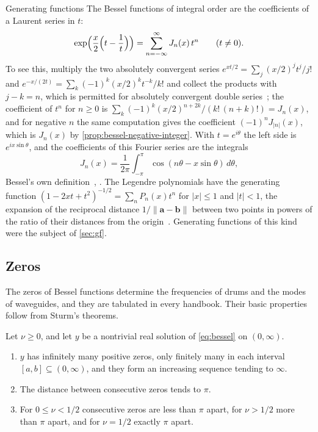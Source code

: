 \begin{note}{Generating functions}
The Bessel functions of integral order are the coefficients of a Laurent series in $t$:
\[
\exp\Bigl(\frac x2\Bigl(t-\frac1t\Bigr)\Bigr)=\sum_{n=-\infty}^\infty J_n(x)\,t^n\qquad(t\ne0).
\]
To see this, multiply the two absolutely convergent series $e^{xt/2}=\sum_j(x/2)^jt^j/j!$ and $e^{-x/(2t)}=\sum_k(-1)^k(x/2)^kt^{-k}/k!$ and collect the products with $j-k=n$, which is permitted for absolutely convergent double series~\cite[Chap.~II]{knopp1990}; the coefficient of $t^n$ for $n\ge0$ is $\sum_k(-1)^k(x/2)^{n+2k}/(k!\,(n+k)!)=J_n(x)$, and for negative $n$ the same computation gives the coefficient $(-1)^nJ_{|n|}(x)$, which is $J_n(x)$ by \cref{prop:bessel-negative-integer}. With $t=e^{i\theta}$ the left side is $e^{ix\sin\theta}$, and the coefficients of this Fourier series are the integrals
\[
J_n(x)=\frac1{2\pi}\int_{-\pi}^\pi\cos(n\theta-x\sin\theta)\,d\theta ,
\]
Bessel's own definition~\cite{bessel1824}, \cite[Chap.~II]{watson1944}. The Legendre polynomials have the generating function $(1-2xt+t^2)^{-1/2}=\sum_nP_n(x)t^n$ for $|x|\le1$ and $|t|<1$, the expansion of the reciprocal distance $1/\|\mathbf a-\mathbf b\|$ between two points in powers of the ratio of their distances from the origin~\cite[Chap.~XV]{whittaker1927}. Generating functions of this kind were the subject of \cref{sec:gf}.
\end{note}

\subsection{Zeros}

The zeros of Bessel functions determine the frequencies of drums and the modes of waveguides, and they are tabulated in every handbook. Their basic properties follow from Sturm's theorems.

\begin{theorem}
\label{thm:bessel-zeros}
Let $\nu\ge0$, and let $y$ be a nontrivial real solution of \eqref{eq:bessel} on $(0,\infty)$.
\begin{enumerate}
\item $y$ has infinitely many positive zeros, only finitely many in each interval $[a,b]\subseteq(0,\infty)$, and they form an increasing sequence tending to $\infty$.
\item The distance between consecutive zeros tends to $\pi$.
\item For $0\le\nu<1/2$ consecutive zeros are less than $\pi$ apart, for $\nu>1/2$ more than $\pi$ apart, and for $\nu=1/2$ exactly $\pi$ apart.
\end{enumerate}
\end{theorem}

